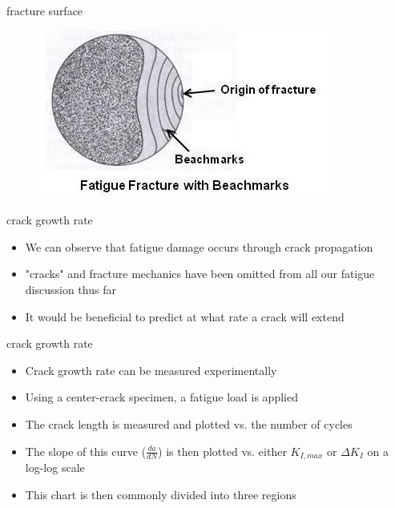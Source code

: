 \documentclass[10pt]{beamer}
\begin{document}
\begin{frame}{fracture surface}	
	\begin{figure}
	\centering
	\includegraphics[width=0.7\linewidth]{../Figures/Fatigue-Fracture-with-Beachmarks}
	\label{fig:Fatigue-Fracture-with-Beachmarks}
	\end{figure}
\end{frame}

\begin{frame}{crack growth rate}
	\begin{itemize}[<+->]
	\item We can observe that fatigue damage occurs through crack propagation
	\item "cracks" and fracture mechanics have been omitted from all our fatigue discussion thus far
	\item It would be beneficial to predict at what rate a crack will extend
	\end{itemize}
\end{frame}

\begin{frame}{crack growth rate}
	\begin{itemize}[<+->]
		\item Crack growth rate can be measured experimentally 
		\item Using a center-crack specimen, a fatigue load is applied
		\item The crack length is measured and plotted vs. the number of cycles
		\item The slope of this curve ($\frac{da}{dN}$) is then plotted vs. either $K_{I,max}$ or $\Delta K_I$ on a log-log scale
		\item This chart is then commonly divided into three regions
	\end{itemize}
\end{frame}
\end{document}
